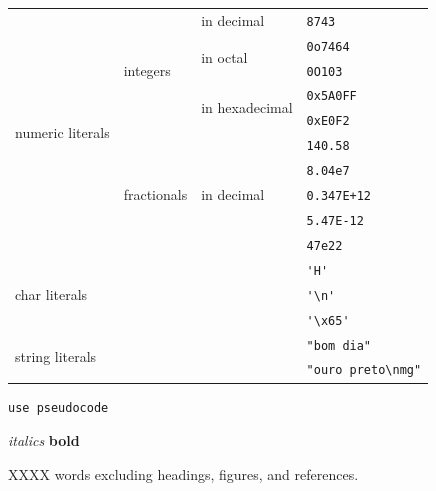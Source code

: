 \documentclass[11pt]{article} %
\begin{document}
\begin{tabular}{|l|l|l|l|}\hline
  \multirow{10}{*}{numeric literals} 				& \multirow{5}{*}{integers} 	& in decimal 					& \verb|8743| \\ \cline{3-4}
  					    				& 				       	& \multirow{2}{*}{in octal}   		& \verb|0o7464| \\ \cline{4-4}
  					    				& 					& 						& \verb|0O103| \\ \cline{3-4}
  					    				& 					& \multirow{2}{*}{in hexadecimal}	& \verb|0x5A0FF| \\ \cline{4-4}
 				 	    				& 					& 						& \verb|0xE0F2| \\ \cline{2-4}
  					    				& \multirow{5}{*}{fractionals} 	& \multirow{5}{*}{in decimal} 		& \verb|140.58| \\ \cline{4-4}
 				 					& 					& 						& \verb|8.04e7| \\ \cline{4-4}
  									& 					& 						& \verb|0.347E+12| \\ \cline{4-4}
  									& 					& 						& \verb|5.47E-12| \\ \cline{4-4}
  									& 					& 						& \verb|47e22| \\ \cline{1-4}
  \multicolumn{3}{|l|}{\multirow{3}{*}{char literals}} 													& \verb|'H'| \\ \cline{4-4}
  \multicolumn{3}{|l|}{} 																	& \verb|'\n'| \\ \cline{4-4}          %
  \multicolumn{3}{|l|}{} 																	& \verb|'\x65'| \\ \cline{1-4}        %
  \multicolumn{3}{|l|}{\multirow{2}{*}{string literals}} 												& \verb|"bom dia"| \\ \cline{4-4}
  \multicolumn{3}{|l|}{} 																	& \verb|"ouro preto\nmg"| \\ \cline{1-4}          %
\end{tabular}




\begin{verbatim}
use pseudocode
\end{verbatim}

\textit{italics}
\textbf{bold}

XXXX words excluding headings, figures, and references. \\

%
%
%




\end{document}
